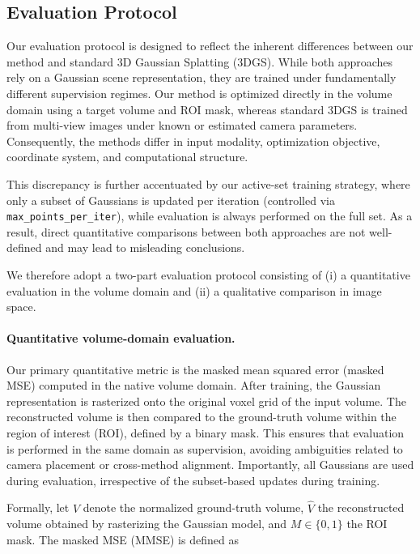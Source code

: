 \documentclass[runningheads]{llncs}
\begin{document}
\subsection{Evaluation Protocol}
\label{sec:evaluation}

Our evaluation protocol is designed to reflect the inherent differences between our method and standard 3D Gaussian Splatting (3DGS). While both approaches rely on a Gaussian scene representation, they are trained under fundamentally different supervision regimes. Our method is optimized directly in the volume domain using a target volume and ROI mask, whereas standard 3DGS is trained from multi-view images under known or estimated camera parameters. Consequently, the methods differ in input modality, optimization objective, coordinate system, and computational structure.

This discrepancy is further accentuated by our active-set training strategy, where only a subset of Gaussians is updated per iteration (controlled via \texttt{max\_points\_per\_iter}), while evaluation is always performed on the full set. As a result, direct quantitative comparisons between both approaches are not well-defined and may lead to misleading conclusions.

We therefore adopt a two-part evaluation protocol consisting of (i) a quantitative evaluation in the volume domain and (ii) a qualitative comparison in image space.

\paragraph{Quantitative volume-domain evaluation.}
Our primary quantitative metric is the masked mean squared error (masked MSE) computed in the native volume domain. After training, the Gaussian representation is rasterized onto the original voxel grid of the input volume. The reconstructed volume is then compared to the ground-truth volume within the region of interest (ROI), defined by a binary mask. This ensures that evaluation is performed in the same domain as supervision, avoiding ambiguities related to camera placement or cross-method alignment. Importantly, all Gaussians are used during evaluation, irrespective of the subset-based updates during training.

Formally, let $V$ denote the normalized ground-truth volume, $\hat{V}$ the reconstructed volume obtained by rasterizing the Gaussian model, and $M \in \{0,1\}$ the ROI mask. The masked MSE (MMSE) is defined as
\end{document}
